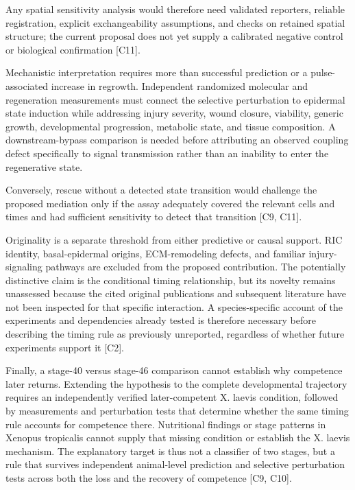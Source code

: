 \documentclass[11pt]{article}
\begin{document}
Any spatial sensitivity analysis would therefore need validated reporters, reliable registration, explicit exchangeability assumptions, and checks on retained spatial structure; the current proposal does not yet supply a calibrated negative control or biological confirmation [C11].

Mechanistic interpretation requires more than successful prediction or a pulse-associated increase in regrowth. Independent randomized molecular and regeneration measurements must connect the selective perturbation to epidermal state induction while addressing injury severity, wound closure, viability, generic growth, developmental progression, metabolic state, and tissue composition. A downstream-bypass comparison is needed before attributing an observed coupling defect specifically to signal transmission rather than an inability to enter the regenerative state.

Conversely, rescue without a detected state transition would challenge the proposed mediation only if the assay adequately covered the relevant cells and times and had sufficient sensitivity to detect that transition [C9, C11].

Originality is a separate threshold from either predictive or causal support. RIC identity, basal-epidermal origins, ECM-remodeling defects, and familiar injury-signaling pathways are excluded from the proposed contribution. The potentially distinctive claim is the conditional timing relationship, but its novelty remains unassessed because the cited original publications and subsequent literature have not been inspected for that specific interaction. A species-specific account of the experiments and dependencies already tested is therefore necessary before describing the timing rule as previously unreported, regardless of whether future experiments support it [C2].

Finally, a stage-40 versus stage-46 comparison cannot establish why competence later returns. Extending the hypothesis to the complete developmental trajectory requires an independently verified later-competent X. laevis condition, followed by measurements and perturbation tests that determine whether the same timing rule accounts for competence there. Nutritional findings or stage patterns in Xenopus tropicalis cannot supply that missing condition or establish the X. laevis mechanism. The explanatory target is thus not a classifier of two stages, but a rule that survives independent animal-level prediction and selective perturbation tests across both the loss and the recovery of competence [C9, C10].
\end{document}
